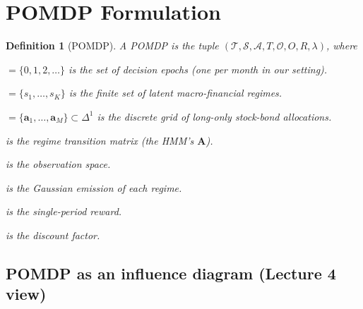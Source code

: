 \documentclass[11pt]{article}
\theoremstyle{plain1}
\theoremstyle{definition1}
\newtheorem{definition}{Definition}
\newcommand{\R}{\mathbb{R}}
\newcommand{\E}{\mathbb{E}}
\newcommand{\1}{\mathbf{1}}
\newcommand{\state}{\mathcal{S}}
\newcommand{\action}{\mathcal{A}}
\newcommand{\Obs}{\mathcal{O}}
\begin{document}
\section{POMDP Formulation}\label{sec:pomdp-formal}

\begin{definition}[POMDP]\label{def:pomdp}
A POMDP is the tuple $(\mathcal{T}, \state, \action, T, \Obs, O, R, \lambda)$, where
\begin{description}[itemsep=2pt,topsep=2pt]
  \item[$\mathcal{T}$] $= \{0, 1, 2, \ldots\}$ is the set of decision epochs (one per month in our setting).
  \item[$\state$] $= \{s_1, \ldots, s_K\}$ is the finite set of latent macro-financial regimes.
  \item[$\action$] $= \{\mathbf{a}_1, \ldots, \mathbf{a}_M\} \subset \Delta^1$ is the discrete grid of long-only stock-bond allocations.
  \item[$T(s' \mid s)$] is the regime transition matrix (the HMM's $\mathbf{A}$).
  \item[$\Obs \subseteq \R^d$] is the observation space.
  \item[$O(\mathbf{o} \mid s) = \mathcal{N}(\mathbf{o}; \boldsymbol{\mu}_s, \boldsymbol{\Sigma}_s)$] is the Gaussian emission of each regime.
  \item[{$R(s, \mathbf{a}) = \E_{\mathbf{r}\mid s}[U(\mathbf{a}^\top \mathbf{r})] - c\lVert\mathbf{a} - \mathbf{a}_{\rm prev}\rVert_1$}] is the single-period reward.
  \item[$\lambda \in (0, 1)$] is the discount factor.
\end{description}
\end{definition}

\subsection{POMDP as an influence diagram (Lecture 4 view)}
\end{document}
